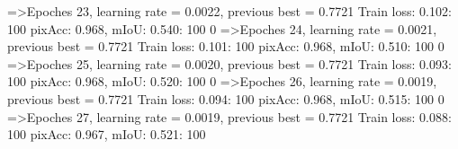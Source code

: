=>Epoches 23, learning rate = 0.0022,                 previous best = 0.7721
Train loss: 0.102: 100%
pixAcc: 0.968, mIoU: 0.540: 100%
  0%
=>Epoches 24, learning rate = 0.0021,                 previous best = 0.7721
Train loss: 0.101: 100%
pixAcc: 0.968, mIoU: 0.510: 100%
  0%
=>Epoches 25, learning rate = 0.0020,                 previous best = 0.7721
Train loss: 0.093: 100%
pixAcc: 0.968, mIoU: 0.520: 100%
  0%
=>Epoches 26, learning rate = 0.0019,                 previous best = 0.7721
Train loss: 0.094: 100%
pixAcc: 0.968, mIoU: 0.515: 100%
  0%
=>Epoches 27, learning rate = 0.0019,                 previous best = 0.7721
Train loss: 0.088: 100%
pixAcc: 0.967, mIoU: 0.521: 100%
